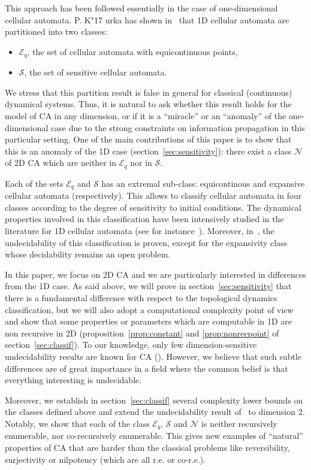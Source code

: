 \documentclass{llncs}
\newcommand{\equpt}{\mathcal{E}_q}
\newcommand{\sensi}{\mathcal{S}}
\newcommand{\nono}{\mathcal{N}}
\begin{document}
This approach has been followed essentially in the case of
one-dimensional cellular automata. P.  K{\accent"17 u}rka has shown
in~\cite{Kurka97} that 1D cellular automata are partitioned into two
classes:
\begin{itemize}
\item $\equpt$, the set of cellular automata with equicontinuous points,
\item $\sensi$, the set of sensitive cellular automata.
\end{itemize}
We stress that this partition result is false in general for classical
(continuous) dynamical systems. Thus, it is natural to ask whether
this result holds for the model of CA in any dimension, or if it is a
``miracle'' or an ``anomaly'' of the one-dimensional case due to the
strong constraints on information propagation in this particular
setting.  One of the main contributions of this paper is to show that
this is an anomaly of the 1D case (section~\ref{sec:sensitivity}):
there exist a class $\nono$ of 2D CA which are neither in $\equpt$ nor
in $\sensi$.


Each of the sets $\equpt$ and $\sensi$ has an extremal sub-class:
equicontinous and expansive cellular automata (respectively).  This
allows to classify cellular automata in four classes according to the
degree of sensitivity to initial conditions. The dynamical properties
involved in this classification have been intensively studied in the
literature for 1D cellular automata (see for
instance~\cite{Kurka97,BlanchardMaass,tisseur,permExp}).
Moreover, in~\cite{varouch}, the undecidability of this classification
is proven, except for the expansivity class whose decidability remains
an open problem.

In this paper, we focus on 2D CA and we are particularly interested in
differences from the 1D case. As said above, we will prove in
section~\ref{sec:sensitivity} that there is a fundamental difference
with respect to the topological dynamics classification, but we will
also adopt a computational complexity point of view and show that some
properties or parameters which are computable in 1D are non recursive
in 2D (proposition~\ref{prop:constant} and \ref{prop:nonrecpoint} of
section~\ref{sec:classif}). To our knowledge, only few
dimension-sensitive undecidability results are known for CA
(\cite{kari94,Bernardi}).  However, we believe that such subtle
differences are of great importance in a field where the common belief
is that everything interesting is undecidable.

Moreover, we establish in section~\ref{sec:classif} several complexity
lower bounds on the classes defined above and extend the
undecidability result of~\cite{varouch} to dimension 2. Notably, we
show that each of the class $\equpt$, $\sensi$ and $\nono$ is neither
recursively enumerable, nor co-recursively enumerable. This gives new
examples of ``natural'' properties of CA that are harder than the
classical problems like reversibility, surjectivity or nilpotency
(which are all r.e. or co-r.e.).
\end{document}
